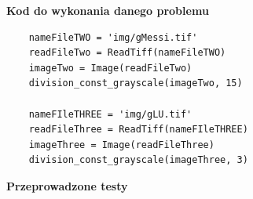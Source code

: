 \documentclass[magisterska,openany]{pracadypl}
\begin{document}
\vspace{0.5cm}
\textbf{\Large Kod do wykonania danego problemu}
\lstset{language=Python}
\vspace{0.25cm}
\begin{lstlisting}
	nameFileTWO = 'img/gMessi.tif'
	readFileTwo = ReadTiff(nameFileTWO)
	imageTwo = Image(readFileTwo)
	division_const_grayscale(imageTwo, 15)
	
	nameFIleTHREE = 'img/gLU.tif'
	readFileThree = ReadTiff(nameFIleTHREE)
	imageThree = Image(readFileThree)
	division_const_grayscale(imageThree, 3)

\end{lstlisting}


\vspace{0.25cm}\textbf{\Large Przeprowadzone testy}
\vspace{0.5cm}
\end{document}
